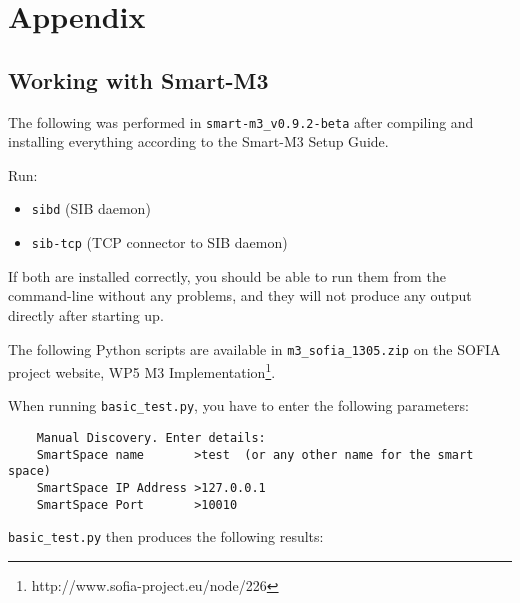 \chapter{Appendix}


\section{Working with Smart-M3}

The following was performed in \texttt{smart-m3\_v0.9.2-beta} after compiling and installing everything according to the Smart-M3 Setup Guide.

Run:
\begin{itemize}
	\item \texttt{sibd} (SIB daemon)
	\item \texttt{sib-tcp} (TCP connector to SIB daemon)
\end{itemize}

If both are installed correctly, you should be able to run them from the command-line without any problems, and they will not produce any output directly after starting up.

The following Python scripts are available in \texttt{m3\_sofia\_1305.zip} on the SOFIA project website, WP5 M3 Implementation\footnote{http://www.sofia-project.eu/node/226}.

When running \texttt{basic\_test.py}, you have to enter the following parameters:

\begin{verbatim}
	Manual Discovery. Enter details:
	SmartSpace name       >test  (or any other name for the smart space)
	SmartSpace IP Address >127.0.0.1                          	
	SmartSpace Port       >10010
\end{verbatim}

\texttt{basic\_test.py} then produces the following results:

